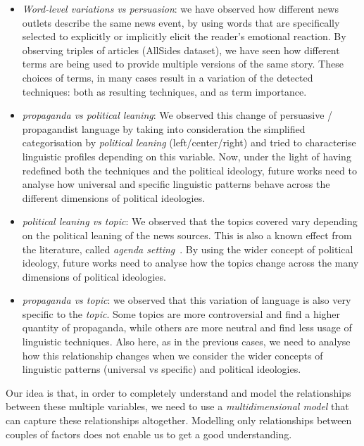 \begin{itemize}
    \item \emph{Word-level variations vs persuasion}: we have observed how different news outlets describe the same news event, by using words that are specifically selected to explicitly or implicitly elicit the reader’s emotional reaction. By observing triples of articles (AllSides dataset), we have seen how different terms are being used to provide multiple versions of the same story. These choices of terms, in many cases result in a variation of the detected techniques: both as resulting techniques, and as term importance.

    \item \emph{propaganda vs political leaning}: We observed this change of persuasive / propagandist language by taking into consideration the simplified categorisation by \emph{political leaning} (left/center/right) and tried to characterise linguistic profiles depending on this variable. Now, under the light of having redefined both the techniques and the political ideology, future works need to analyse how universal and specific linguistic patterns behave across the different dimensions of political ideologies.

    \item \emph{political leaning vs topic}: We observed that the topics covered vary depending on the political leaning of the news sources. This is also a known effect from the literature, called \emph{agenda setting}~\citep{mccombs1972agenda}. By using the wider concept of political ideology, future works need to analyse how the topics change across the many dimensions of political ideologies.

    \item \emph{propaganda vs topic}: we observed that this variation of language is also very specific to the \emph{topic}. Some topics are more controversial and find a higher quantity of propaganda, while others are more neutral and find less usage of linguistic techniques. Also here, as in the previous cases, we need to analyse how this relationship changes when we consider the wider concepts of linguistic patterns (universal vs specific) and political ideologies.
\end{itemize}

Our idea is that, in order to completely understand and model the relationships between these multiple variables, we need to use a \emph{multidimensional model} that can capture these relationships altogether. Modelling only relationships between couples of factors does not enable us to get a good understanding.

